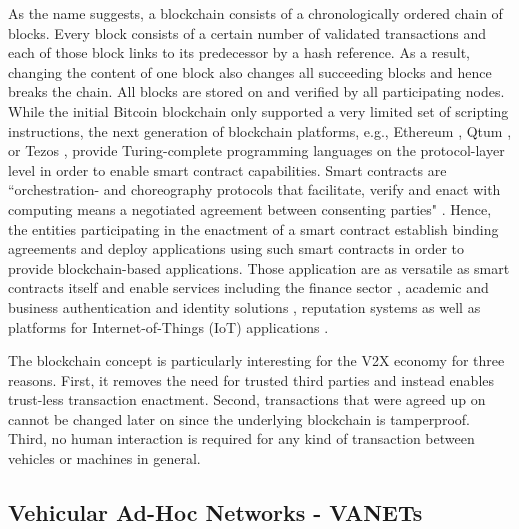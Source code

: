 \documentclass{llncs}
\begin{document}
{			As the name suggests, a blockchain consists of a chronologically ordered chain of blocks. Every block consists of a certain number of validated transactions and each of those block links to its predecessor by a hash reference. As a result, changing the content of one block also changes all succeeding blocks and hence breaks the chain. All blocks are stored on and verified by all participating nodes. While the initial Bitcoin blockchain only supported a very limited set of scripting instructions, the next generation of blockchain platforms, e.g., Ethereum \cite{wood2014ethereum}, Qtum \cite{qtumWhitepaper}, or Tezos \cite{tezosWhitepaper}, provide Turing-complete programming languages on the protocol-layer level in order to enable smart contract capabilities. Smart contracts are ``orchestration- and choreography protocols that facilitate, verify and enact with computing means a negotiated agreement between consenting parties" \cite{qtumWhitepaper}. Hence, the entities participating in the enactment of a smart contract establish binding agreements and deploy applications using such smart contracts in order to provide blockchain-based applications. Those application are as versatile as smart contracts itself and enable services including the finance sector \cite{nguyen2016blockchain}\cite{saltWhitepaper}, academic and business authentication and identity solutions \cite{leidingUnchained}\cite{CivicWhitepaper}\cite{AuthcoinLeiding2016MCIS}\cite{mccorry2015authenticated}\cite{SelfkeyWhitepaper}, reputation systems \cite{SemadaWhitepaper} as well as platforms for Internet-of-Things (IoT) applications \cite{christidis2016blockchains}\cite{ouaddah2017towards}. 	
			
			The blockchain concept is particularly interesting for the V2X economy for three reasons. First, it removes the need for trusted third parties and instead enables trust-less transaction enactment. Second, transactions that were agreed up on cannot be changed later on since the underlying blockchain is tamperproof. Third, no human interaction is required for any kind of transaction between vehicles or machines in general.


		
		\subsection{Vehicular Ad-Hoc Networks - VANETs}
			\label{ss:vanets}

}
\end{document}
